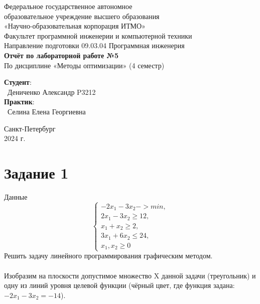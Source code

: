 \documentclass{article}
\begin{document}
\begin{center}
    \Large
    Федеральное государственное автономное \\
    образовательное учреждение высшего образования \\ 
    «Научно-образовательная корпорация ИТМО»\\
    \vspace{0.5cm}
    \large
    Факультет программной инженерии и компьютерной техники \\
    Направление подготовки 09.03.04 Программная инженерия \\
    \vspace{1cm}
    \Large
    \textbf{Отчёт по лабораторной работе №5} \\
    По дисциплине «Методы оптимизации» (4 семестр)\\
    \large
    \vspace{8cm}

    \begin{minipage}{.33\textwidth}
    \end{minipage}
    \hfill
    \begin{minipage}{.4\textwidth}
    
        \textbf{Студент}: \vspace{.1cm} \\
        \ Дениченко Александр P3212\\
        \textbf{Практик}:  \\
        \ Селина Елена Георгиевна
    \end{minipage}
    \vfill
Санкт-Петербург\\ 2024 г.
\end{center}
\pagestyle{empty}
\newpage
\pagestyle{plain}


\section*{Задание 1}
Данные\\
\[\begin{cases}
    -2x_1 - 3x_2 -> min,\\
    2x_1-3x_2\geq 12,\\
    x_1+x_2\geq2,\\
    3x_1+6x_2 \leq 24,\\
    x_1,x_2\geq 0
\end{cases}\]
Решить задачу линейного программирования графическим методом. 
\\ \\
Изобразим на плоскости допустимое множество X данной задачи (треугольник) и одну из линий уровня целевой
функции (чёрный цвет, где функция задана: $-2x_1 - 3x_2 = -14$).
\end{document}
